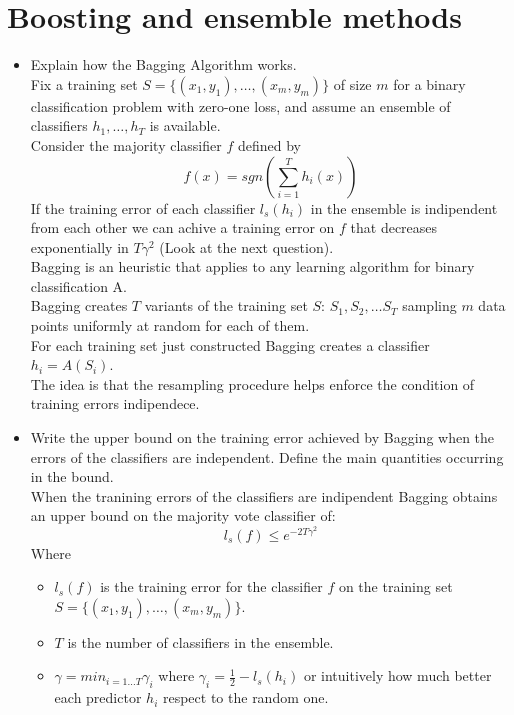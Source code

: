\newpage
\section{Boosting and ensemble methods}

\begin{itemize}

    \item Explain how the Bagging Algorithm works.\\

    Fix a training set $S = \{(x_1 , y_1),\dots,(x_m , y_m)\}$ of size $m$ for a binary classification problem with zero-one loss, and 
    assume an ensemble of classifiers $h_1, \dots , h_T$ is available.\\
    Consider the majority classifier $f$ defined by $$f(x) = sgn(\sum_{i=1}^{T} {h_i(x)})$$
    If the training error of each classifier $l_s(h_i)$ in the ensemble is indipendent from each other we can achive a training error on $f$ that decreases exponentially in $T\gamma^2$ (Look at the next question).\\
    Bagging is an heuristic that applies to any learning algorithm for binary classification A.\\ 
    Bagging creates $T$ variants of the training set $S$: $S_1, S_2, \dots S_T$ sampling $m$ data points uniformly at random for each of them.\\
    For each training set just constructed Bagging creates a classifier $h_i = A(S_i)$.\\
    The idea is that the resampling procedure helps enforce the condition of training errors indipendece.\\

    \item Write the upper bound on the training error achieved by Bagging when the errors of the classifiers are independent. Define the main quantities occurring in the bound.\\

        When the tranining errors of the classifiers are indipendent Bagging obtains an upper bound on the majority vote classifier of:
        $$l_s(f) \leq e^{-2T\gamma^2}$$
        Where
        \begin{itemize}
            \item $l_s(f)$ is the training error for the classifier $f$ on the training set $S = \{(x_1 , y_1),\dots,(x_m , y_m)\}$.\\
            \item $T$ is the number of classifiers in the ensemble.\\
            \item $\gamma = min_{i=1 \dots T} \gamma_i$ where  $\gamma_i = \frac{1}{2} - l_s(h_i)$ or intuitively how much better each predictor $h_i$ respect to the random one.\\
        \end{itemize}
        

\end{itemize}
